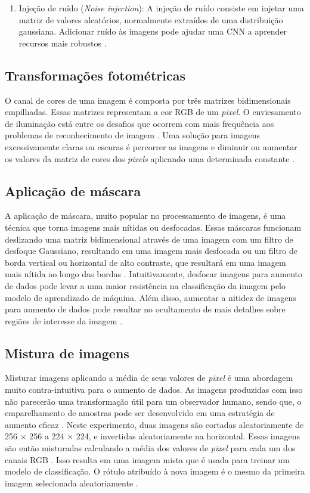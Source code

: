 \documentclass[
	12pt,				%
	oneside,			%
	a4paper,			%
	english,			%
	brazil				%
	]{abntex2ppgsi}
\begin{document}
\begin{enumerate}
  \item Injeção de ruído (\textit{Noise injection}): A injeção de ruído consiste em injetar uma matriz de valores aleatórios, normalmente extraídos de uma distribuição gaussiana. Adicionar ruído às imagens pode ajudar uma CNN a aprender recursos mais robustos \cite{shorten2019survey}.
\end{enumerate}

\subsection{Transformações fotométricas}
O canal de cores de uma imagem é composta por três matrizes bidimensionais empilhadas. Essas matrizes representam a cor RGB de um \textit{pixel}. O enviesamento de iluminação está entre os desafios que ocorrem com mais frequência aos problemas de reconhecimento de imagem \cite{shorten2019survey}. Uma solução para imagens excessivamente claras ou escuras é percorrer as imagens e diminuir ou aumentar os valores da matriz de cores dos \textit{pixels} aplicando uma determinada constante \cite{shorten2019survey}.

\subsection{Aplicação de máscara}
A aplicação de máscara, muito popular no processamento de imagens, é uma técnica que torna imagens mais nítidas ou desfocadas. Essas máscaras funcionam deslizando uma matriz bidimensional através de uma imagem com um filtro de desfoque Gaussiano, resultando em uma imagem mais desfocada ou um filtro de borda vertical ou horizontal de alto contraste, que resultará em uma imagem mais nítida ao longo das bordas \cite{shorten2019survey}. Intuitivamente, desfocar imagens para aumento de dados pode levar a uma maior resistência na classificação da imagem pelo modelo de aprendizado de máquina. Além disso, aumentar a nitidez de imagens para aumento de dados pode resultar no ocultamento de mais detalhes sobre regiões de interesse da imagem \cite{shorten2019survey}.

\subsection{Mistura de imagens}
Misturar imagens aplicando a média de seus valores de \textit{pixel} é uma abordagem muito contra-intuitiva para o aumento de dados. As imagens produzidas com isso não parecerão uma transformação útil para um observador humano, sendo que, o emparelhamento de amostras pode ser desenvolvido em uma estratégia de aumento eficaz \cite{shorten2019survey}. Neste experimento, duas imagens são cortadas aleatoriamente de 256 × 256 a 224 × 224, e invertidas aleatoriamente na horizontal. Essas imagens são então misturadas calculando a média dos valores de \textit{pixel} para cada um dos canais RGB \cite{shorten2019survey}. Isso resulta em uma imagem mista que é usada para treinar um modelo de classificação. O rótulo atribuído à nova imagem é o mesmo da primeira imagem selecionada aleatoriamente \cite{shorten2019survey}.
\end{document}
